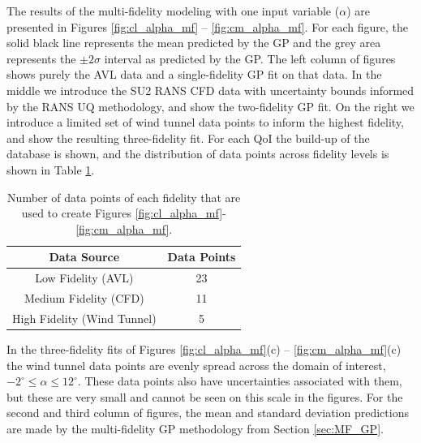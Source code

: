 The results of the multi-fidelity modeling with one input variable ($\alpha$) are presented in Figures \ref{fig:cl_alpha_mf} -- \ref{fig:cm_alpha_mf}. For each figure, the solid black line represents the mean predicted by the GP and the grey area represents the $\pm 2\sigma$ interval as predicted by the GP. The left column of figures shows purely the AVL data and a single-fidelity GP fit on that data. In the middle we introduce the SU2 RANS CFD data with uncertainty bounds informed by the RANS UQ methodology, and show the two-fidelity GP fit. On the right we introduce a limited set of wind tunnel data points to inform the highest fidelity, and show the resulting three-fidelity fit. For each QoI the build-up of the database is shown, and the distribution of data points across fidelity levels is shown in Table \ref{table:data_points}.

\begin{table}
\centering
    \captionsetup{justification=centering}
    \caption{Number of data points of each fidelity that are used to create Figures \ref{fig:cl_alpha_mf}-\ref{fig:cm_alpha_mf}.} 
    \begin{tabular}{|c|c|}
        \hline
        Data Source & Data Points \\ \hline \hline
        Low Fidelity (AVL) & 23 \\ \hline
        Medium Fidelity (CFD) & 11 \\ \hline 
        High Fidelity (Wind Tunnel) & 5 \\ \hline 
    \end{tabular}
    \label{table:data_points}
\end{table}

In the three-fidelity fits of Figures \ref{fig:cl_alpha_mf}(c) -- \ref{fig:cm_alpha_mf}(c) the wind tunnel data points are evenly spread across the domain of interest, $-2^\circ \leq \alpha \leq 12^\circ$. These data points also have uncertainties associated with them, but these are very small and cannot be seen on this scale in the figures. For the second and third column of figures, the mean and standard deviation predictions are made by the multi-fidelity GP methodology from Section \ref{sec:MF_GP}. 

